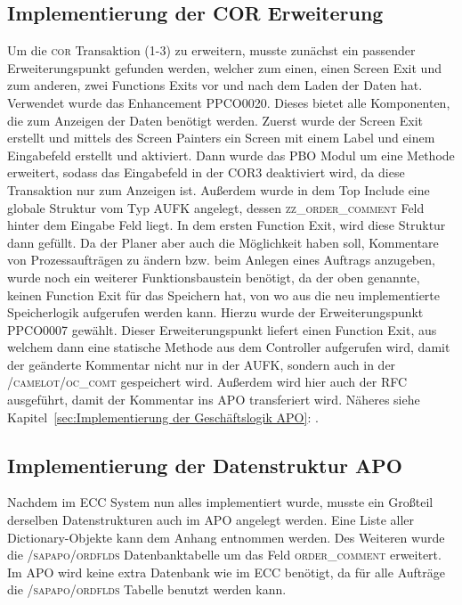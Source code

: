 \subsection{Implementierung der COR Erweiterung}
\label{sec:Implementierung der COR Erweiterung}   
Um die \textsc{cor} Transaktion (1-3) zu erweitern, musste zunächst ein passender Erweiterungspunkt gefunden werden, welcher zum einen, einen Screen Exit und zum anderen, zwei Functions Exits vor und nach dem Laden der Daten hat. Verwendet wurde das Enhancement PPCO0020. Dieses bietet alle Komponenten, die zum Anzeigen der Daten benötigt werden. Zuerst wurde der Screen Exit erstellt und mittels des Screen Painters ein Screen mit einem Label und einem Eingabefeld erstellt und aktiviert. Dann wurde das \ac{PBO} Modul um eine Methode erweitert, sodass das Eingabefeld in der \textsc{COR3} deaktiviert wird, da diese Transaktion nur zum Anzeigen ist. Außerdem wurde in dem Top Include eine globale Struktur vom Typ AUFK angelegt, dessen \textsc{zz\_order\_comment} Feld hinter dem Eingabe Feld liegt. In dem ersten Function Exit, wird diese Struktur dann gefüllt. Da der Planer aber auch die Möglichkeit haben soll, Kommentare von Prozessaufträgen zu ändern bzw. beim Anlegen eines Auftrags anzugeben, wurde noch ein weiterer Funktionsbaustein benötigt, da der oben genannte, keinen Function Exit für das Speichern hat, von wo aus die neu implementierte Speicherlogik aufgerufen werden kann. Hierzu wurde der Erweiterungspunkt PPCO0007 gewählt. Dieser Erweiterungspunkt liefert einen Function Exit, aus welchem dann eine statische Methode aus dem Controller aufgerufen wird, damit der geänderte Kommentar nicht nur in der AUFK, sondern auch in der \textsc{/camelot/oc\_comt} gespeichert wird. Außerdem wird hier auch der \ac{RFC} ausgeführt, damit der Kommentar ins \ac{APO} transferiert wird. Näheres siehe Kapitel~\ref{sec:Implementierung der Geschäftslogik APO}: .

\subsection{Implementierung der Datenstruktur APO}
\label{sec:Implementierung der Datenstruktur APO} 
Nachdem im \ac{ECC} System nun alles implementiert wurde, musste ein Großteil derselben Datenstrukturen auch im \ac{APO} angelegt werden. Eine Liste aller Dictionary-Objekte kann dem Anhang entnommen werden. Des Weiteren wurde die \textsc{/sapapo/ordflds} Datenbanktabelle um das Feld \textsc{order\_comment} erweitert. Im \ac{APO} wird keine extra Datenbank wie im \ac{ECC} benötigt, da für alle Aufträge die \textsc{/sapapo/ordflds} Tabelle benutzt werden kann.

